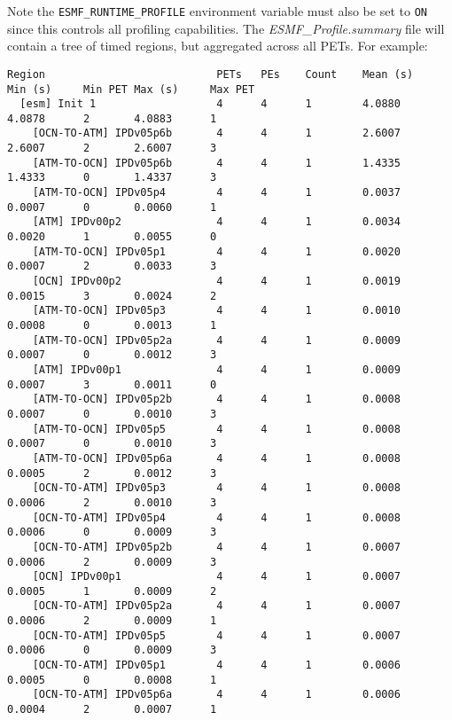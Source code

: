 Note the {\tt ESMF\_RUNTIME\_PROFILE} environment variable must
also be set to {\tt ON} since this controls all profiling capabilities.
The {\em ESMF\_Profile.summary} file will contain a tree of
timed regions, but aggregated across all PETs. For example:

\begin{verbatim}
Region                           PETs   PEs    Count    Mean (s)    Min (s)     Min PET Max (s)     Max PET
  [esm] Init 1                   4      4      1        4.0880      4.0878      2       4.0883      1
    [OCN-TO-ATM] IPDv05p6b       4      4      1        2.6007      2.6007      2       2.6007      3
    [ATM-TO-OCN] IPDv05p6b       4      4      1        1.4335      1.4333      0       1.4337      3
    [ATM-TO-OCN] IPDv05p4        4      4      1        0.0037      0.0007      0       0.0060      1
    [ATM] IPDv00p2               4      4      1        0.0034      0.0020      1       0.0055      0
    [ATM-TO-OCN] IPDv05p1        4      4      1        0.0020      0.0007      2       0.0033      3
    [OCN] IPDv00p2               4      4      1        0.0019      0.0015      3       0.0024      2
    [ATM-TO-OCN] IPDv05p3        4      4      1        0.0010      0.0008      0       0.0013      1
    [ATM-TO-OCN] IPDv05p2a       4      4      1        0.0009      0.0007      0       0.0012      3
    [ATM] IPDv00p1               4      4      1        0.0009      0.0007      3       0.0011      0
    [ATM-TO-OCN] IPDv05p2b       4      4      1        0.0008      0.0007      0       0.0010      3
    [ATM-TO-OCN] IPDv05p5        4      4      1        0.0008      0.0007      0       0.0010      3
    [ATM-TO-OCN] IPDv05p6a       4      4      1        0.0008      0.0005      2       0.0012      3
    [OCN-TO-ATM] IPDv05p3        4      4      1        0.0008      0.0006      2       0.0010      3
    [OCN-TO-ATM] IPDv05p4        4      4      1        0.0008      0.0006      0       0.0009      3
    [OCN-TO-ATM] IPDv05p2b       4      4      1        0.0007      0.0006      2       0.0009      3
    [OCN] IPDv00p1               4      4      1        0.0007      0.0005      1       0.0009      2
    [OCN-TO-ATM] IPDv05p2a       4      4      1        0.0007      0.0006      2       0.0009      1
    [OCN-TO-ATM] IPDv05p5        4      4      1        0.0007      0.0006      0       0.0009      3
    [OCN-TO-ATM] IPDv05p1        4      4      1        0.0006      0.0005      0       0.0008      1
    [OCN-TO-ATM] IPDv05p6a       4      4      1        0.0006      0.0004      2       0.0007      1

\end{verbatim}
